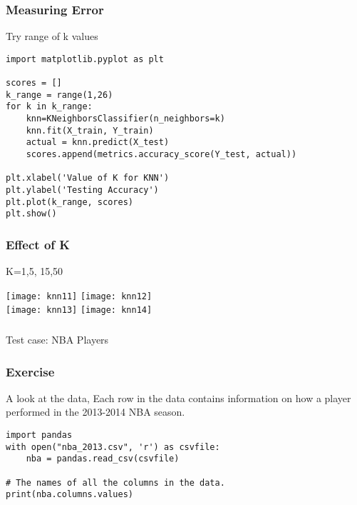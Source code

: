 \begin{frame}[fragile]\frametitle{Measuring Error}
Try range of k values
\begin{lstlisting}
import matplotlib.pyplot as plt
    
scores = []
k_range = range(1,26)
for k in k_range:
    knn=KNeighborsClassifier(n_neighbors=k)
    knn.fit(X_train, Y_train)
    actual = knn.predict(X_test)
    scores.append(metrics.accuracy_score(Y_test, actual))

plt.xlabel('Value of K for KNN')
plt.ylabel('Testing Accuracy')
plt.plot(k_range, scores)
plt.show()
\end{lstlisting}
\end{frame}


\begin{frame}[fragile]\frametitle{Effect of K}
K=1,5, 15,50
\begin{center}
\texttt{[image: knn11]}
\texttt{[image: knn12]}\\
\texttt{[image: knn13]}
\texttt{[image: knn14]}
\end{center}
\end{frame}

\begin{frame}[fragile]\frametitle{}
\begin{center}
{\Large Test case: NBA Players}
\end{center}
\end{frame}

\begin{frame}[fragile]\frametitle{Exercise}
A look at the data, Each row in the data contains information on how a player performed in the 2013-2014 NBA season.
\begin{lstlisting}
import pandas
with open("nba_2013.csv", 'r') as csvfile:
    nba = pandas.read_csv(csvfile)

# The names of all the columns in the data.
print(nba.columns.values)
\end{lstlisting}
\end{frame}

